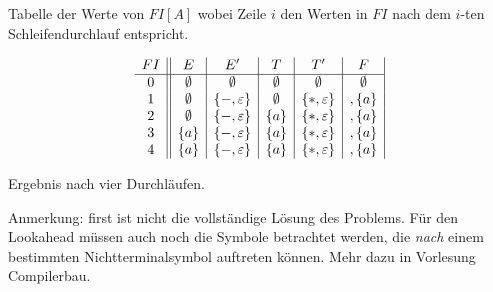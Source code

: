 {Tabelle der Werte von $FI[A]$ wobei Zeile $i$ den Werten in $FI$ nach
dem $i$-ten Schleifendurchlauf entspricht.

\begin{displaymath}
  \begin{array}{c||c|c|c|c|c|}
    FI & E & E' & T & T' & F \\\hline
    0  & \emptyset & \emptyset & \emptyset & \emptyset & \emptyset \\
    1  & \emptyset & \{ -, \varepsilon \} & \emptyset & \{ *, \varepsilon \} & , \{a\} \\
    2  & \emptyset & \{ -, \varepsilon \} & \{a\} & \{ *, \varepsilon \} & , \{a\} \\
    3  & \{a\} & \{ -, \varepsilon \} & \{a\} & \{ *, \varepsilon \} & , \{a\} \\
    4  & \{a\} & \{ -, \varepsilon \} & \{a\} & \{ *, \varepsilon \} & , \{a\} \\
  \end{array}
\end{displaymath}

Ergebnis nach vier Durchläufen. 

Anmerkung: first ist nicht die vollständige Lösung des Problems. Für
den Lookahead müssen auch noch die Symbole betrachtet werden, die
\emph{nach} einem bestimmten Nichtterminalsymbol auftreten können. Mehr dazu
in Vorlesung Compilerbau. 
}
